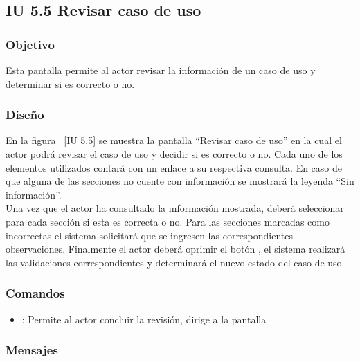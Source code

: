 \newpage 
\subsection{IU 5.5 Revisar caso de uso}

\subsubsection{Objetivo}
	
	Esta pantalla permite al actor revisar la información de un caso de uso y determinar si es correcto o no.

\subsubsection{Diseño}

    En la figura ~\ref{IU 5.5} se muestra la pantalla ``Revisar caso de uso'' en la cual el actor podrá revisar el caso de uso y decidir si es correcto o no. Cada uno de los elementos utilizados contará con un enlace a su respectiva consulta. En caso de que alguna de las secciones no cuente con información se mostrará la leyenda ``Sin información''. \\
	
	Una vez que el actor ha consultado la información mostrada, deberá seleccionar para cada sección si esta es correcta o no. Para las secciones marcadas como incorrectas el sistema solicitará que se ingresen las correspondientes observaciones. Finalmente el actor deberá oprimir el botón , el sistema realizará las validaciones correspondientes y determinará el nuevo estado del caso de uso.


\subsubsection{Comandos}
\begin{itemize}
	\item {}: Permite al actor concluir la revisión, dirige a la pantalla 
\end{itemize}

\subsubsection{Mensajes}
	

